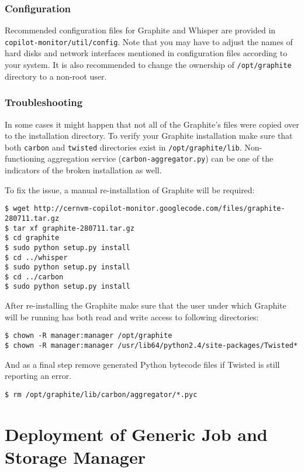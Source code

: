 \subsubsection{Configuration}
Recommended configuration files for Graphite and Whisper are provided in \texttt{copilot-monitor/util/config}. Note that you may have to adjust the names of hard disks and network interfaces mentioned in configuration files according to your system.
It is also recommended to change the ownership of \texttt{/opt/graphite} directory to a non-root user.

\subsubsection{Troubleshooting}
In some cases it might happen that not all of the Graphite's files were copied over to the installation directory.
To verify your Graphite installation make sure that both \texttt{carbon} and \texttt{twisted} directories exist in \texttt{/opt/graphite/lib}.
Non-functioning aggregation service (\texttt{carbon-aggregator.py}) can be one of the indicators of the broken installation as well.

To fix the issue, a manual re-installation of Graphite will be required:
\lstset{caption=Manual installation of Graphite}
\begin{lstlisting}
$ wget http://cernvm-copilot-monitor.googlecode.com/files/graphite-280711.tar.gz
$ tar xf graphite-280711.tar.gz
$ cd graphite
$ sudo python setup.py install
$ cd ../whisper
$ sudo python setup.py install
$ cd ../carbon
$ sudo python setup.py install
\end{lstlisting}

After re-installing the Graphite make sure that the user under which Graphite will be running has
both read and write access to following directories:
\lstset{caption=Adjusting directory permissions}
\begin{lstlisting}
$ chown -R manager:manager /opt/graphite
$ chown -R manager:manager /usr/lib64/python2.4/site-packages/Twisted*
\end{lstlisting}

And as a final step remove generated Python bytecode files if Twisted is still reporting an error.
\lstset{caption=Removing Python bytecode files}
\begin{lstlisting}
$ rm /opt/graphite/lib/carbon/aggregator/*.pyc
\end{lstlisting}

\section{Deployment of \copilot Generic Job and Storage Manager}
